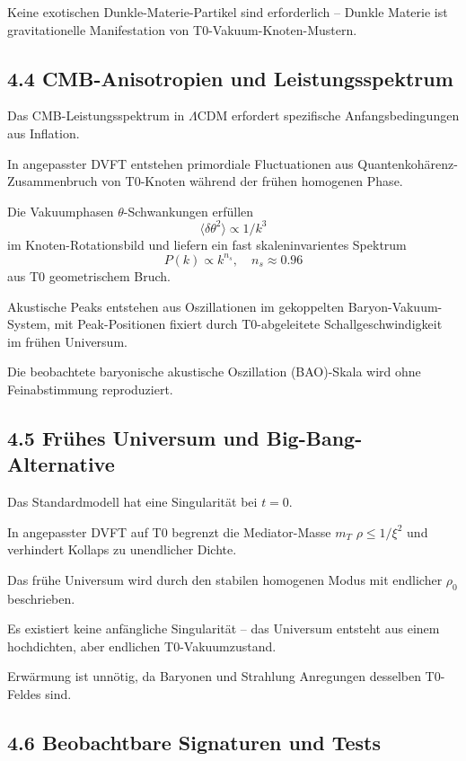 	Keine exotischen Dunkle-Materie-Partikel sind erforderlich – Dunkle Materie ist gravitationelle Manifestation von T0-Vakuum-Knoten-Mustern.
	
	\subsection{4.4 CMB-Anisotropien und Leistungsspektrum}
	
	Das CMB-Leistungsspektrum in $\Lambda$CDM erfordert spezifische Anfangsbedingungen aus Inflation.
	
	In angepasster DVFT entstehen primordiale Fluctuationen aus Quantenkohärenz-Zusammenbruch von T0-Knoten während der frühen homogenen Phase.
	
	Die Vakuumphasen $\theta$-Schwankungen erfüllen
	\[
	\langle \delta \theta^2 \rangle \propto 1/k^3
	\]
	im Knoten-Rotationsbild und liefern ein fast skaleninvarientes Spektrum
	\[
	P(k) \propto k^{n_s}, \quad n_s \approx 0.96
	\]
	aus T0 geometrischem Bruch.
	
	Akustische Peaks entstehen aus Oszillationen im gekoppelten Baryon-Vakuum-System, mit Peak-Positionen fixiert durch T0-abgeleitete Schallgeschwindigkeit im frühen Universum.
	
	Die beobachtete baryonische akustische Oszillation (BAO)-Skala wird ohne Feinabstimmung reproduziert.
	
	\subsection{4.5 Frühes Universum und Big-Bang-Alternative}
	
	Das Standardmodell hat eine Singularität bei $t=0$.
	
	In angepasster DVFT auf T0 begrenzt die Mediator-Masse $m_T$ $\rho \leq 1/\xi^2$ und verhindert Kollaps zu unendlicher Dichte.
	
	Das frühe Universum wird durch den stabilen homogenen Modus mit endlicher $\rho_0$ beschrieben.
	
	Es existiert keine anfängliche Singularität – das Universum entsteht aus einem hochdichten, aber endlichen T0-Vakuumzustand.
	
	Erwärmung ist unnötig, da Baryonen und Strahlung Anregungen desselben T0-Feldes sind.
	
	\subsection{4.6 Beobachtbare Signaturen und Tests}
	
